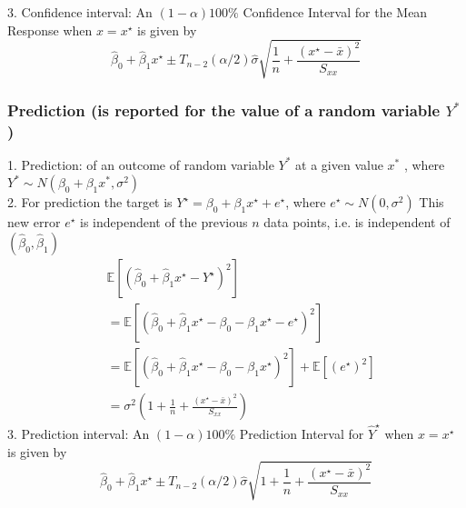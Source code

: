 \documentclass[11pt,a4paper]{article}
\begin{document}
3. Conﬁdence interval: An $(1-\alpha) 100 \%$ Confidence Interval for the Mean Response when $x=x^{\star}$ is given by
$$
\hat{\beta}_{0}+\hat{\beta}_{1} x^{\star} \pm T_{n-2}(\alpha / 2) \hat{\sigma} \sqrt{\frac{1}{n}+\frac{\left(x^{\star}-\bar{x}\right)^{2}}{S_{x x}}}
$$

\subsubsection{Prediction (is reported for the value of a random variable $Y^*$)}
1. Prediction: of an outcome of random variable $Y^*$ at a given value $x^*$ , where $Y^* \sim N( \beta_0 + \beta_1 x^* , \sigma^2 )$\\
2. For prediction the target is $Y^{\star}=\beta_{0}+\beta_{1} x^{\star}+e^{\star}$, where $e^{\star} \sim N\left(0, \sigma^{2}\right)$ This new error $e^{\star}$ is independent of the previous $n$ data points, i.e. is independent of $\left(\hat{\beta}_{0}, \hat{\beta}_{1}\right)$
$$
\begin{aligned}
&\mathbb{E}\left[\left(\hat{\beta}_{0}+\hat{\beta}_{1} x^{\star}-Y^{\star}\right)^{2}\right] \\
&=\mathbb{E}\left[\left(\hat{\beta}_{0}+\hat{\beta}_{1} x^{\star}-\beta_{0}-\beta_{1} x^{\star}-e^{\star}\right)^{2}\right] \\
&=\mathbb{E}\left[\left(\hat{\beta}_{0}+\hat{\beta}_{1} x^{\star}-\beta_{0}-\beta_{1} x^{\star}\right)^{2}\right]+\mathbb{E}\left[\left(e^{\star}\right)^{2}\right] \\
&=\sigma^{2}\left(1+\frac{1}{n}+\frac{\left(x^{\star}-\bar{x}\right)^{2}}{S_{x x}}\right)
\end{aligned}
$$
3. Prediction interval: An $(1-\alpha) 100 \%$ Prediction Interval for $\hat{Y}^{\star}$ when $x=x^{\star}$ is given by
$$
\hat{\beta}_{0}+\hat{\beta}_{1} x^{\star} \pm T_{n-2}(\alpha / 2) \hat{\sigma} \sqrt{1+\frac{1}{n}+\frac{\left(x^{\star}-\bar{x}\right)^{2}}{S_{x x}}}
$$
\end{document}
